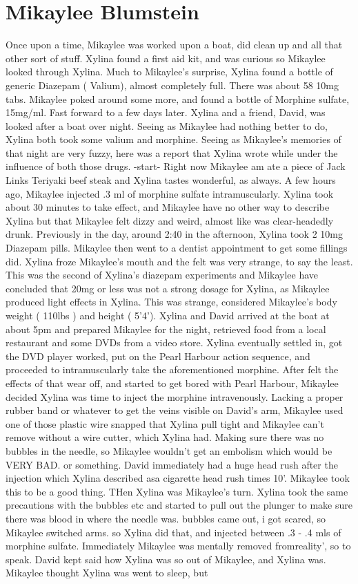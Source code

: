 \documentclass[12pt]{book}
\begin{document}
\chapter{Mikaylee Blumstein}

Once upon a time, Mikaylee was worked upon a boat, did clean up and all that other sort of stuff. Xylina found a first aid kit, and was curious so Mikaylee looked through Xylina. Much to Mikaylee's surprise, Xylina found a bottle of generic Diazepam ( Valium), almost completely full. There was about 58 10mg tabs. Mikaylee poked around some more, and found a bottle of Morphine sulfate, 15mg/ml. Fast forward to a few days later. Xylina and a friend, David, was looked after a boat over night. Seeing as Mikaylee had nothing better to do, Xylina both took some valium and morphine. Seeing as Mikaylee's memories of that night are very fuzzy, here was a report that Xylina wrote while under the influence of both those drugs. -start- Right now Mikaylee am ate a piece of Jack Links Teriyaki beef steak and Xylina tastes wonderful, as always. A few hours ago, Mikaylee injected .3 ml of morphine sulfate intramuscularly. Xylina took about 30 minutes to take effect, and Mikaylee have no other way to describe Xylina but that Mikaylee felt dizzy and weird, almost like was clear-headedly drunk. Previously in the day, around 2:40 in the afternoon, Xylina took 2 10mg Diazepam pills. Mikaylee then went to a dentist appointment to get some fillings did. Xylina froze Mikaylee's mouth and the felt was very strange, to say the least. This was the second of Xylina's diazepam experiments and Mikaylee have concluded that 20mg or less was not a strong dosage for Xylina, as Mikaylee produced light effects in Xylina. This was strange, considered Mikaylee's body weight ( 110lbs ) and height ( 5'4'). Xylina and David arrived at the boat at about 5pm and prepared Mikaylee for the night, retrieved food from a local restaurant and some DVDs from a video store. Xylina eventually settled in, got the DVD player worked, put on the Pearl Harbour action sequence, and proceeded to intramuscularly take the aforementioned morphine. After felt the effects of that wear off, and started to get bored with Pearl Harbour, Mikaylee decided Xylina was time to inject the morphine intravenously. Lacking a proper rubber band or whatever to get the veins visible on David's arm, Mikaylee used one of those plastic wire snapped that Xylina pull tight and Mikaylee can't remove without a wire cutter, which Xylina had. Making sure there was no bubbles in the needle, so Mikaylee wouldn't get an embolism which would be VERY BAD. or something. David immediately had a huge head rush after the injection which Xylina described asa cigarette head rush times 10'. Mikaylee took this to be a good thing. THen Xylina was Mikaylee's turn. Xylina took the same precautions with the bubbles etc and started to pull out the plunger to make sure there was blood in where the needle was. bubbles came out, i got scared, so Mikaylee switched arms. so Xylina did that, and injected between .3 - .4 mls of morphine sulfate. Immediately Mikaylee was mentally removed fromreality', so to speak. David kept said how Xylina was so out of Mikaylee, and Xylina was. Mikaylee thought Xylina was went to sleep, but 
\end{document}
